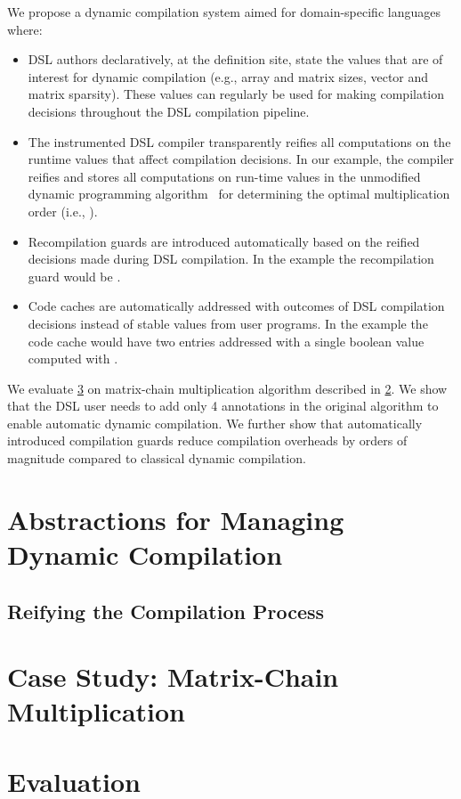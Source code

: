 We propose a dynamic compilation system aimed for domain-specific languages where:
\begin{itemize}

  \item DSL authors declaratively, at the definition site, state the values that
    are of interest for dynamic compilation (e.g., array and matrix sizes, vector
    and matrix sparsity). These values can regularly be used for making
    compilation decisions throughout the DSL compilation pipeline.

  \item The instrumented DSL compiler transparently reifies all computations on
   the runtime values that affect compilation decisions. In our example,
   the compiler reifies and stores all computations on run-time values in the
   unmodified dynamic programming algorithm~\cite{cormen2001introduction} for determining the
   optimal multiplication order (i.e., ).

  \item Recompilation guards are introduced automatically based on the reified decisions made during DSL
   compilation. In the example the recompilation guard would be .

  \item Code caches are automatically addressed with outcomes of DSL compilation
   decisions instead of stable values from user programs. In the example
   the code cache would have two entries addressed with a single boolean
   value computed with .

\end{itemize}

We evaluate \ref{sec:p2-evaluation} on matrix-chain multiplication algorithm described
 in \ref{sec:matrix-chain-multiplication}. We show that the DSL user needs to add only
 4 annotations in the original algorithm to enable automatic dynamic compilation. We further
 show that automatically introduced compilation guards reduce compilation overheads by orders of magnitude
 compared to classical dynamic compilation.

\section{Abstractions for Managing Dynamic Compilation}

\subsection{Reifying the Compilation Process}

\section{Case Study: Matrix-Chain Multiplication}
\label{sec:matrix-chain-multiplication}

\section{Evaluation}
\label{sec:p2-evaluation}

